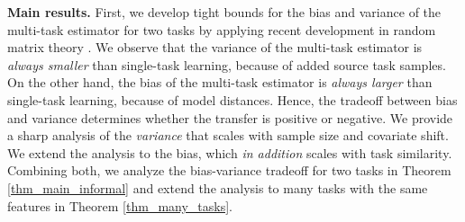 
\textbf{Main results.} First, we develop tight bounds for the bias and variance of the multi-task estimator for two tasks by applying recent development in random matrix theory \cite{erdos2017dynamical,isotropic,Anisotropic}.
We observe that the variance of the multi-task estimator is \textit{always smaller} than single-task learning, because of added source task samples.
On the other hand, the bias of the multi-task estimator is \textit{always larger} than single-task learning, because of model distances.
Hence, the tradeoff between bias and variance determines whether the transfer is positive or negative.
We provide a sharp analysis of the \textit{variance} that scales with sample size and covariate shift.
We extend the analysis to the bias, which \textit{in addition} scales with {task similarity}.
Combining both, we analyze the bias-variance tradeoff for two tasks in Theorem \ref{thm_main_informal} and extend the analysis to many tasks with the same features in Theorem \ref{thm_many_tasks}.






